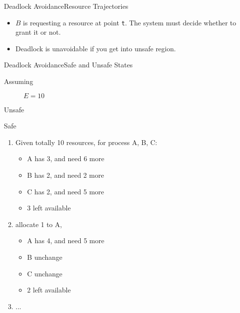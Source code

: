 \begin{frame}{Deadlock Avoidance}{Resource Trajectories}
  \begin{center}
  \end{center}
  \begin{itemize}
  \item $B$ is requesting a resource at point \texttt{t}. The system must decide whether
    to grant it or not.
  \item Deadlock is unavoidable if you get into \alert{unsafe region}.
  \end{itemize}
\end{frame}

\begin{frame}{Deadlock Avoidance}{Safe and Unsafe States}
  \begin{description}
    \item[Assuming] $E=10$
  \end{description}
  \begin{block}{Unsafe}
    \centering
    \mode<beamer>{ \texttt{[image: deadlock-avoidance-2]} }%
  \end{block}
  \begin{block}{Safe}
    \centering
    \mode<beamer>{ \texttt{[image: mos-figs-3-9]} }%
  \end{block}
\end{frame}

\begin{enumerate}
\item Given totally 10 resources, for process A, B, C:
  \begin{itemize}
  \item A has 3, and need 6 more
  \item B has 2, and need 2 more
  \item C has 2, and need 5 more
  \item 3 left available
  \end{itemize}
\item allocate 1 to A,
  \begin{itemize}
  \item A has 4, and need 5 more
  \item B unchange
  \item C unchange
  \item 2 left available
  \end{itemize}
\item ...
\end{enumerate}

